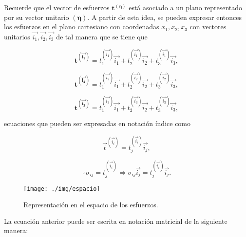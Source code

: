 \documentclass{article}
\begin{document}
    Recuerde que el vector de esfuerzos $\bm{t^{\bm{(\eta)}}}$ est\'{a} asociado a un plano 
    representado por su vector unitario $\bm{(\eta)}$. A partir de esta idea, se pueden
    expresar entonces los esfuerzos en el plano cartesiano con coordenadas $x_{1}, x_{2}, x_{3}$ 
    con vectores unitarios $\vec{i_{1}}, \vec{i_{2}}, \vec{i_{3}}$ de tal manera que se tiene que

    \begin{equation}
        \bm{t^{(\vec{i_{1}})}} = t_{1}^{(\vec{i_{1}})}\vec{i_{1}} + 
        t_{2}^{(\vec{i_{1}})}\vec{i_{2}} + 
        t_{3}^{(\vec{i_{1}})}\vec{i_{3}},
    \end{equation}

    \begin{equation}
        \bm{t^{(\vec{i_{2}})}} = t_{1}^{(\vec{i_{2}})}\vec{i_{1}} + 
        t_{2}^{(\vec{i_{2}})}\vec{i_{2}} + 
        t_{3}^{(\vec{i_{2}})}\vec{i_{3}},
    \end{equation}

    \begin{equation}
        \bm{t^{(\vec{i_{3}})}} = t_{1}^{(\vec{i_{3}})}\vec{i_{1}} + 
        t_{2}^{(\vec{i_{3}})}\vec{i_{2}} + 
        t_{3}^{(\vec{i_{3}})}\vec{i_{3}},
    \end{equation}

    ecuaciones que pueden ser expresadas en notaci\'{o}n \'{i}ndice como

    \begin{equation}
        \vec{t}^{(\vec{i_{i}})} = t_{j}^{(\vec{i_{i}})}\vec{i_{j}},
    \end{equation}

    \begin{equation}
        \therefore \sigma_{ij} = t_{j}^{(\vec{i_{i}})} \Longrightarrow 
        \sigma_{ij}\vec{i_{j}} = t_{j}^{(\vec{i_{i}})}\vec{i_{j}}.
    \end{equation}

    \begin{figure}[H]
        
        \centering

        \texttt{[image: ./img/espacio]}
        \caption{Representaci\'{o}n en el espacio de los esfuerzos.}
        \label{fig:espacio}
    \end{figure}

    La ecuaci\'{o}n anterior puede ser escrita en notaci\'{o}n matricial de la siguiente manera:
\end{document}
